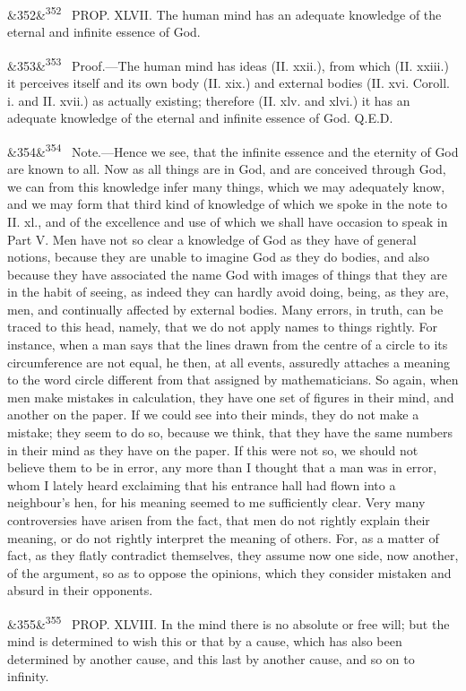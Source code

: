 \documentclass[12pt]{article}
\newcommand{\para}[1][]{\par\noindent\ifx&#1&\else\textsuperscript{\footnotesize #1}~\fi}
\begin{document}
\para[352] PROP. XLVII. The human mind has an adequate knowledge of the eternal and infinite essence of God.

\para[353] Proof.---The human mind has ideas (II. xxii.), from which (II. xxiii.) it perceives itself and its own body (II. xix.) and external bodies (II. xvi. Coroll. i. and II. xvii.) as actually existing; therefore (II. xlv. and xlvi.) it has an adequate knowledge of the eternal and infinite essence of God. Q.E.D.

\para[354] Note.---Hence we see, that the infinite essence and the eternity of God are known to all. Now as all things are in God, and are conceived through God, we can from this knowledge infer many things, which we may adequately know, and we may form that third kind of knowledge of which we spoke in the note to II. xl., and of the excellence and use of which we shall have occasion to speak in Part V. Men have not so clear a knowledge of God as they have of general notions, because they are unable to imagine God as they do bodies, and also because they have associated the name God with images of things that they are in the habit of seeing, as indeed they can hardly avoid doing, being, as they are, men, and continually affected by external bodies. Many errors, in truth, can be traced to this head, namely, that we do not apply names to things rightly. For instance, when a man says that the lines drawn from the centre of a circle to its circumference are not equal, he then, at all events, assuredly attaches a meaning to the word circle different from that assigned by mathematicians. So again, when men make mistakes in calculation, they have one set of figures in their mind, and another on the paper. If we could see into their minds, they do not make a mistake; they seem to do so, because we think, that they have the same numbers in their mind as they have on the paper. If this were not so, we should not believe them to be in error, any more than I thought that a man was in error, whom I lately heard exclaiming that his entrance hall had flown into a neighbour's hen, for his meaning seemed to me sufficiently clear. Very many controversies have arisen from the fact, that men do not rightly explain their meaning, or do not rightly interpret the meaning of others. For, as a matter of fact, as they flatly contradict themselves, they assume now one side, now another, of the argument, so as to oppose the opinions, which they consider mistaken and absurd in their opponents.

\para[355] PROP. XLVIII. In the mind there is no absolute or free will; but the mind is determined to wish this or that by a cause, which has also been determined by another cause, and this last by another cause, and so on to infinity.
\end{document}
